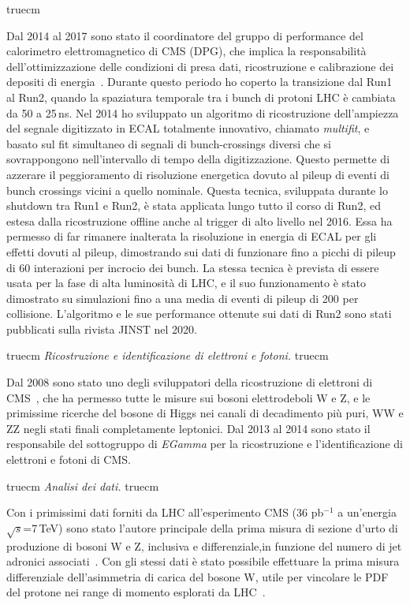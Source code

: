 \documentclass[11pt,twoside,a4paper]{article}
\begin{document}
 truecm

Dal 2014 al 2017 sono stato il coordinatore del gruppo di performance
del calorimetro elettromagnetico di CMS (DPG), che implica la
responsabilit\`a dell'ottimizzazione delle condizioni di presa dati,
ricostruzione e calibrazione dei depositi di
energia~\cite{Khachatryan:2015iwa}. Durante questo periodo ho coperto
la transizione dal Run1 al Run2, quando la spaziatura temporale tra i
bunch di protoni LHC \`e cambiata da 50 a 25\,ns. Nel 2014 ho
sviluppato un algoritmo di ricostruzione dell'ampiezza del segnale
digitizzato in ECAL totalmente innovativo, chiamato \textit{multifit},
e basato sul fit simultaneo di segnali di bunch-crossings diversi che
si sovrappongono nell'intervallo di tempo della digitizzazione.
Questo permette di azzerare il peggioramento di risoluzione energetica
dovuto al pileup di eventi di bunch crossings vicini a quello
nominale.  Questa tecnica, sviluppata durante lo shutdown tra Run1 e
Run2, \`e stata applicata lungo tutto il corso di Run2, ed estesa
dalla ricostruzione offline anche al trigger di alto livello nel 2016.
Essa ha permesso di far rimanere inalterata la risoluzione in energia
di ECAL per gli effetti dovuti al pileup, dimostrando sui dati di
funzionare fino a picchi di pileup di 60 interazioni per incrocio dei
bunch. La stessa tecnica \`e prevista di essere usata per la fase di
alta luminosit\`a di LHC, e il suo funzionamento \`e stato dimostrato
su simulazioni fino a una media di eventi di pileup di 200 per
collisione. L'algoritmo e le sue performance ottenute sui dati di Run2
sono stati pubblicati sulla rivista JINST nel 2020.

 truecm
\textit{Ricostruzione e identificazione di elettroni e fotoni.}
 truecm

Dal 2008 sono stato uno degli sviluppatori della ricostruzione di
elettroni di CMS~\cite{Khachatryan:2015hwa}, che ha permesso tutte le
misure sui bosoni elettrodeboli W e Z, e le primissime ricerche del
bosone di Higgs nei canali di decadimento pi\`u puri, WW e ZZ negli
stati finali completamente leptonici. Dal 2013 al 2014 sono stato il
responsabile del sottogruppo di \textit{EGamma} per la ricostruzione e
l'identificazione di elettroni e fotoni di CMS.

 truecm
\textit{Analisi dei dati.}
 truecm

Con i primissimi dati forniti da LHC all'esperimento CMS (36 pb$^{-1}$
a un'energia $\sqrt{s}$=7\,TeV) sono stato l'autore principale della
prima misura di sezione d'urto di produzione di bosoni W e Z,
inclusiva e differenziale,in funzione del numero di jet adronici
associati~\cite{Chatrchyan:2011ne,Marco:2009dvd,Khachatryan:2010xn,CMS:2011aa}.
Con gli stessi dati \`e stato possibile effettuare la prima misura
differenziale dell'asimmetria di carica del bosone W, utile per
vincolare le PDF del protone nei range di momento esplorati da
LHC~\cite{Chatrchyan:2011jz}.
\end{document}
